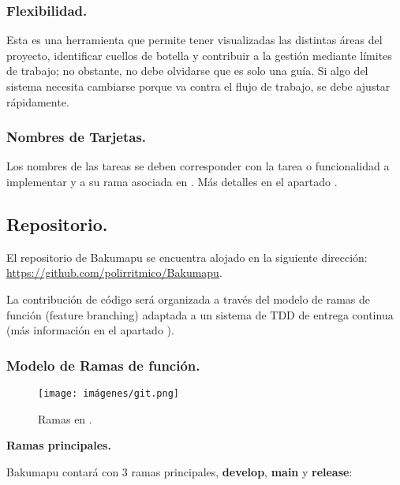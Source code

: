 \subsubsection{Flexibilidad.}\label{flujo:flexibilidad}
Esta es una herramienta que permite tener visualizadas las distintas áreas del proyecto, identificar cuellos de botella y contribuir a la gestión mediante límites de trabajo; no obstante, no debe olvidarse que es solo una guía. Si algo del sistema necesita cambiarse porque va contra el flujo de trabajo, se debe ajustar rápidamente.

\subsubsection{Nombres de Tarjetas.}\label{flujo:nombres-de-tarjetas}
Los nombres de las tareas se deben corresponder con la tarea o funcionalidad a implementar y a su rama asociada en . Más detalles en el apartado .


\subsection{Repositorio.}\label{flujo:repositorio}
El repositorio  de Bakumapu se encuentra alojado en la siguiente dirección: \url{https://github.com/polirritmico/Bakumapu}.

La contribución de código será organizada a través del modelo de ramas de función (feature branching) adaptada a un sistema de TDD de entrega continua (más información en el apartado ).

\subsubsection{Modelo de Ramas de función.}\label{flujo:modelo-de-ramas}
\begin{figure}[H]
	\centering
	\texttt{[image: imágenes/git.png]}
	\caption{Ramas en .}
\end{figure}

\noindent\textbf{Ramas principales.}\label{flujo:ramas-principales}

\noindent Bakumapu contará con 3 ramas principales, \textbf{develop}, \textbf{main} y \textbf{release}:

